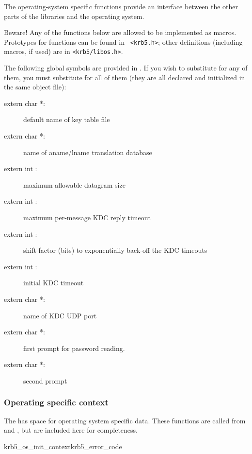 The operating-system specific functions provide an interface between the
other parts of the  libraries and the operating system.

Beware! Any of the functions below are allowed to be implemented as
macros.  Prototypes for functions can be found in {\tt
<krb5.h>}; other definitions (including macros, if used) are
in {\tt <krb5/libos.h>}.

The following global symbols are provided in .  If you
wish to substitute for any of them, you must substitute for all of them
(they are all declared and initialized in the same object file):
\begin{description}
\item[extern char *:] default name of key
table file
\item[extern char *:] name of aname/lname
translation database
\item[extern int :] maximum allowable
datagram size
\item[extern int :] maximum
per-message KDC reply timeout
\item[extern int :] shift factor
(bits) to exponentially back-off the KDC timeouts
\item[extern int :] initial KDC timeout
\item[extern char *:] name of KDC UDP port
\item[extern char *:] first prompt
for password reading.
\item[extern char *:] second prompt

\end{description}

\subsubsection{Operating specific context}
The  has space for operating system specific
data. These functions are called from  and
, but are included here for completeness.

\begin{funcdecl}{krb5_os_init_context}{krb5_error_code}{\funcinout}
\end{funcdecl}

